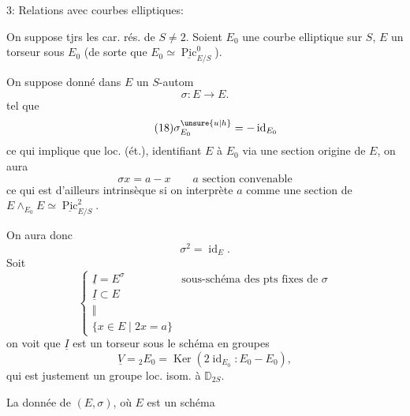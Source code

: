 3: Relations avec courbes elliptiques:

On suppose tjrs les car. rés. de $S\ne2$. Soient $E_0$ une courbe elliptique sur $S$, $E$ un torseur sous $E_0$ (de sorte que $E_0\simeq\underline{\operatorname{Pic}}^0_{E/S}$).

On suppose donné dans $E$ un $S$-autom
\[
\tag{17}\sigma:E\longrightarrow E.
\]
tel que
\[
\tag{18}\sigma_{E_0}^{\unsure{u|h}}=-\operatorname{id}_{E_0}
\]
ce qui implique que loc. (ét.), identifiant $E$ à $E_0$ via une section origine de $E$, on aura
\[
\sigma x=a-x\qquad a\text{ section convenable}
\]
ce qui est d'ailleurs intrinsèque si on interprète $a$ comme une section de $E\wedge_{E_0}E\simeq\underline{\operatorname{Pic}}^2_{E/S}$.

On aura donc
\[
\sigma^2=\operatorname{id}_E.
\]
Soit 
\[
\tag{19}\left\{\begin{array}{ll}
\underline I=E^\sigma&\text{sous-schéma des pts fixes de }\sigma\\
\underline I\subset E&\\[-4pt]
\Vert&\\[-4pt]
\{x\in E\mid 2x=a\}&
\end{array}\right.
\]
on voit que $\underline I$ est un torseur sous le schéma en groupes
\[
\tag{20}\underline V={}_2E_0=\operatorname{Ker}(2\operatorname{id}_{E_0}:E_0-E_0),
\]
qui est justement un groupe  loc. isom. à $\mathbb D_{2S}$.

La donnée de $(E,\sigma)$, où $E$ est un schéma
